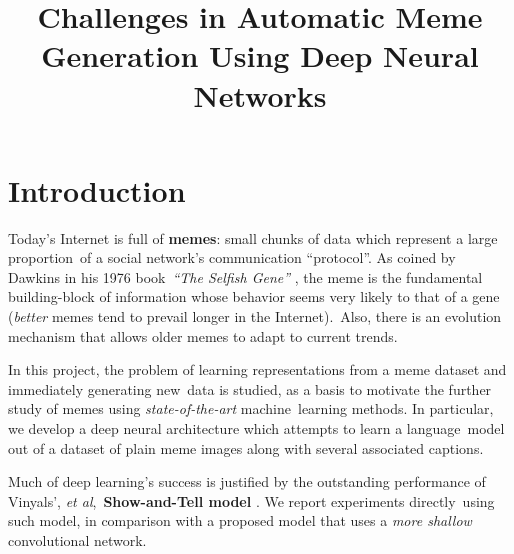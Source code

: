 \documentclass[paper=letter, fontsize=11pt]{scrartcl}
\title{
  \normalsize
  Challenges in Automatic Meme Generation Using Deep Neural Networks
}
\begin{document}
\maketitle

\section*{Introduction}

\noindent
Today's Internet is full of \textbf{memes}: small chunks of data which represent a large proportion\
of a social network's communication ``protocol''. As coined by Dawkins in his 1976 book\
\emph{``The Selfish Gene''} \cite{dawkins2006}, the meme is the fundamental building-block of information whose behavior seems very likely to that of a gene (\emph{better} memes tend to prevail longer in the Internet).\
Also, there is an evolution mechanism that allows older memes to adapt to current trends.\par
In this project, the problem of learning representations from a meme dataset and immediately generating new\
data is studied, as a basis to motivate the further study of memes using \emph{state-of-the-art} machine\
learning methods. In particular, we develop a deep neural architecture which attempts to learn a language\
model out of a dataset of plain meme images along with several associated captions.\par
Much of deep learning's success is justified by the outstanding performance of Vinyals', \textit{et al},\
\textbf{Show-and-Tell model} \cite{DBLP:journals/corr/VinyalsTBE14}. We report experiments directly\
using such model, in comparison with a proposed model that uses a \emph{more shallow} convolutional network.
\end{document}
